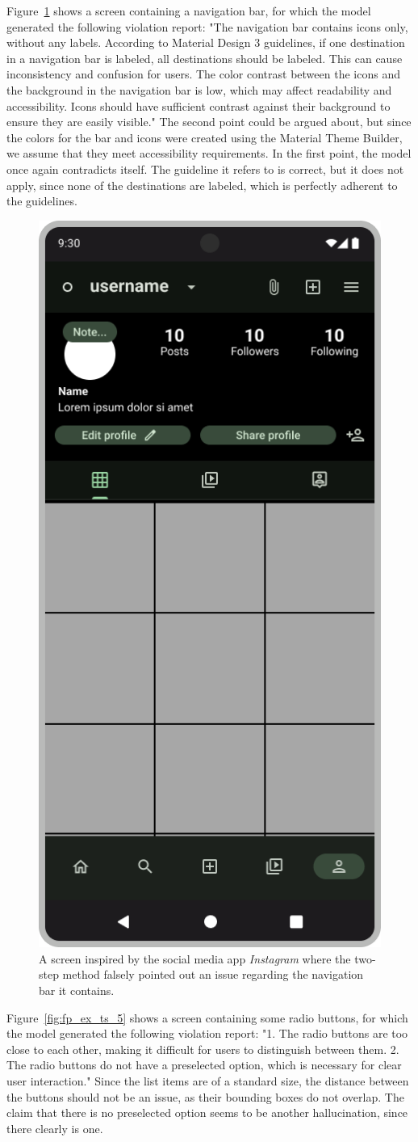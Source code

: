 \documentclass[11pt,titlepage,oneside,openany]{book}
\begin{document}
Figure~\ref{fig:fp_ex_ts_4} shows a screen containing a navigation bar, for which the model generated the following violation report: "The navigation bar contains icons only, without any labels. According to Material Design 3 guidelines, if one destination in a navigation bar is labeled, all destinations should be labeled. This can cause inconsistency and confusion for users. The color contrast between the icons and the background in the navigation bar is low, which may affect readability and accessibility. Icons should have sufficient contrast against their background to ensure they are easily visible." The second point could be argued about, but since the colors for the bar and icons were created using the Material Theme Builder, we assume that they meet accessibility requirements. In the first point, the model once again contradicts itself. The guideline it refers to is correct, but it does not apply, since none of the destinations are labeled, which is perfectly adherent to the guidelines. 

\begin{figure}[t]
	\centering
	\includegraphics[width=.28\textwidth]{figures/fp_ex_ts_4.jpg}
	\caption{A screen inspired by the social media app \emph{Instagram} where the two-step method falsely pointed out an issue regarding the navigation bar it contains.}
	\label{fig:fp_ex_ts_4}
\end{figure}

Figure~\ref{fig:fp_ex_ts_5} shows a screen containing some radio buttons, for which the model generated the following violation report: "1. The radio buttons are too close to each other, making it difficult for users to distinguish between them. 2. The radio buttons do not have a preselected option, which is necessary for clear user interaction." Since the list items are of a standard size, the distance between the buttons should not be an issue, as their bounding boxes do not overlap. The claim that there is no preselected option seems to be another hallucination, since there clearly is one. 
\end{document}
